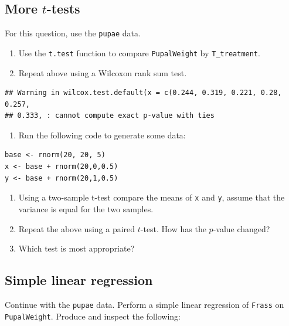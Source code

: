 \documentclass[]{book}
\providecommand{\tightlist}{%
  \setlength{\itemsep}{0pt}\setlength{\parskip}{0pt}}
\begin{document}
\hypertarget{more-t-tests}{%
\subsection{\texorpdfstring{More \(t\)-tests}{More t-tests}}\label{more-t-tests}}

For this question, use the \texttt{pupae} data.

\begin{enumerate}
\def\labelenumi{\arabic{enumi}.}
\item
  Use the \texttt{t.test} function to compare \texttt{PupalWeight} by \texttt{T\_treatment}.
\item
  Repeat above using a Wilcoxon rank sum test.
\end{enumerate}

\begin{verbatim}
## Warning in wilcox.test.default(x = c(0.244, 0.319, 0.221, 0.28, 0.257,
## 0.333, : cannot compute exact p-value with ties
\end{verbatim}

\begin{enumerate}
\def\labelenumi{\arabic{enumi}.}
\setcounter{enumi}{2}
\tightlist
\item
  Run the following code to generate some data:
\end{enumerate}

\begin{verbatim}
base <- rnorm(20, 20, 5)
x <- base + rnorm(20,0,0.5)
y <- base + rnorm(20,1,0.5)
\end{verbatim}

\begin{enumerate}
\def\labelenumi{\arabic{enumi}.}
\setcounter{enumi}{3}
\item
  Using a two-sample t-test compare the means of \texttt{x} and \texttt{y}, assume that the variance is equal for the two samples.
\item
  Repeat the above using a paired \(t\)-test. How has the \(p\)-value changed?
\item
  Which test is most appropriate?
\end{enumerate}

\hypertarget{simple-linear-regression}{%
\subsection{Simple linear regression}\label{simple-linear-regression}}

Continue with the \texttt{pupae} data. Perform a simple linear regression of \texttt{Frass} on \texttt{PupalWeight}. Produce and inspect the following:
\end{document}
